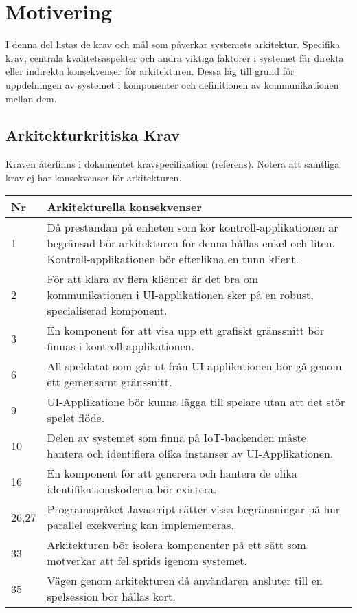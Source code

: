 \section{Motivering}
I denna del listas de krav och mål som påverkar systemets arkitektur. Specifika krav, centrala kvalitetsaspekter och andra viktiga faktorer i systemet får direkta eller indirekta konsekvenser för arkitekturen. Dessa låg till grund för uppdelningen av systemet i komponenter och definitionen av kommunikationen mellan dem.

\subsection{Arkitekturkritiska Krav}
Kraven återfinns i dokumentet kravspecifikation (referens). Notera att samtliga krav ej har konsekvenser för arkitekturen.\\

\begin{center}
    \begin{tabular}{|p{0.5cm}|p{13cm}|}
        \hline
        \textbf{Nr} & \textbf{Arkitekturella konsekvenser}\\
        \hline
        1 & Då prestandan på enheten som kör kontroll-applikationen är begränsad bör arkitekturen för denna hållas enkel och liten. Kontroll-applikationen bör efterlikna en tunn klient.\\
        \hline
        2 & För att klara av flera klienter är det bra om kommunikationen i UI-applikationen sker på en robust, specialiserad komponent.\\
        \hline
        3 & En komponent för att visa upp ett grafiskt gränssnitt bör finnas i kontroll-applikationen.\\
        \hline
        6 & All speldatat som går ut från UI-applikationen bör gå genom ett gemensamt gränssnitt.\\
        \hline
        9 & UI-Applikatione bör kunna lägga till spelare utan att det stör spelet flöde.\\
        \hline
        10 & Delen av systemet som finna på IoT-backenden måste hantera och identifiera olika instanser av UI-Applikationen.\\
        \hline
        16 & En komponent för att generera och hantera de olika identifikationskoderna bör existera.\\
        \hline
        26,27 & Programspråket Javascript sätter vissa begränsningar på hur parallel exekvering kan implementeras.\\
        \hline
        33 & Arkitekturen bör isolera komponenter på ett sätt som motverkar att fel sprids igenom systemet.\\
        \hline
        35 & Vägen genom arkitekturen då användaren ansluter till en spelsession bör hållas kort.\\
        \hline
    \end{tabular}
\end{center}

